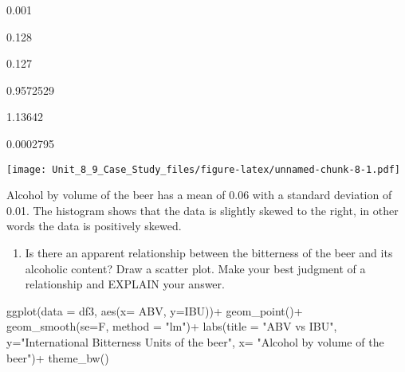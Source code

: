 \documentclass[
]{article}
\newenvironment{Shaded}{\begin{snugshade}}{\end{snugshade}}
\newcommand{\AttributeTok}[1]{\textcolor[rgb]{0.77,0.63,0.00}{#1}}
\newcommand{\DecValTok}[1]{\textcolor[rgb]{0.00,0.00,0.81}{#1}}
\newcommand{\FunctionTok}[1]{\textcolor[rgb]{0.00,0.00,0.00}{#1}}
\newcommand{\NormalTok}[1]{#1}
\newcommand{\SpecialCharTok}[1]{\textcolor[rgb]{0.00,0.00,0.00}{#1}}
\newcommand{\StringTok}[1]{\textcolor[rgb]{0.31,0.60,0.02}{#1}}
\providecommand{\tightlist}{%
  \setlength{\itemsep}{0pt}\setlength{\parskip}{0pt}}
\begin{document}
0.001

0.128

0.127

0.9572529

1.13642

0.0002795

\begin{Shaded}
\end{Shaded}

\texttt{[image: Unit\_8\_9\_Case\_Study\_files/figure-latex/unnamed-chunk-8-1.pdf]}

Alcohol by volume of the beer has a mean of 0.06 with a standard
deviation of 0.01. The histogram shows that the data is slightly skewed
to the right, in other words the data is positively skewed.

\begin{enumerate}
\def\labelenumi{\arabic{enumi}.}
\setcounter{enumi}{6}
\tightlist
\item
  Is there an apparent relationship between the bitterness of the beer
  and its alcoholic content? Draw a scatter plot. Make your best
  judgment of a relationship and EXPLAIN your answer.
\end{enumerate}

\begin{Shaded}
\begin{Highlighting}[]
\FunctionTok{ggplot}\NormalTok{(}\AttributeTok{data =}\NormalTok{ df3, }\FunctionTok{aes}\NormalTok{(}\AttributeTok{x=}\NormalTok{ ABV, }\AttributeTok{y=}\NormalTok{IBU))}\SpecialCharTok{+}
  \FunctionTok{geom\_point}\NormalTok{()}\SpecialCharTok{+}
  \FunctionTok{geom\_smooth}\NormalTok{(}\AttributeTok{se=}\NormalTok{F, }\AttributeTok{method =} \StringTok{"lm"}\NormalTok{)}\SpecialCharTok{+}
  \FunctionTok{labs}\NormalTok{(}\AttributeTok{title =} \StringTok{"ABV vs IBU"}\NormalTok{,}
       \AttributeTok{y=}\StringTok{"International Bitterness Units of the beer"}\NormalTok{,}
       \AttributeTok{x=} \StringTok{"Alcohol by volume of the beer"}\NormalTok{)}\SpecialCharTok{+}
  \FunctionTok{theme\_bw}\NormalTok{()}
\end{Highlighting}
\end{Shaded}
\end{document}
